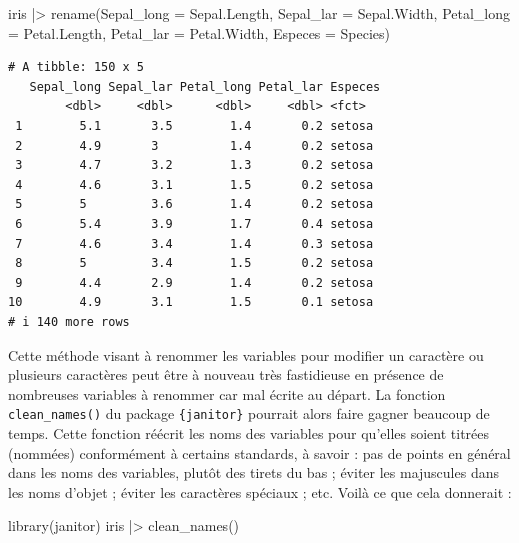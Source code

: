 \documentclass[
  letterpaper,
]{book}
\newenvironment{Shaded}{\begin{snugshade}}{\end{snugshade}}
\newcommand{\AttributeTok}[1]{\textcolor[rgb]{0.40,0.45,0.13}{#1}}
\newcommand{\FunctionTok}[1]{\textcolor[rgb]{0.28,0.35,0.67}{#1}}
\newcommand{\NormalTok}[1]{\textcolor[rgb]{0.00,0.23,0.31}{#1}}
\newcommand{\SpecialCharTok}[1]{\textcolor[rgb]{0.37,0.37,0.37}{#1}}
\begin{document}
\begin{Shaded}
\begin{Highlighting}[]
\NormalTok{iris }\SpecialCharTok{|\textgreater{}} 
  \FunctionTok{rename}\NormalTok{(}\AttributeTok{Sepal\_long =}\NormalTok{ Sepal.Length,}
         \AttributeTok{Sepal\_lar =}\NormalTok{ Sepal.Width,}
         \AttributeTok{Petal\_long =}\NormalTok{ Petal.Length,}
         \AttributeTok{Petal\_lar =}\NormalTok{ Petal.Width,}
         \AttributeTok{Especes =}\NormalTok{ Species)}
\end{Highlighting}
\end{Shaded}

\begin{verbatim}
# A tibble: 150 x 5
   Sepal_long Sepal_lar Petal_long Petal_lar Especes
        <dbl>     <dbl>      <dbl>     <dbl> <fct>  
 1        5.1       3.5        1.4       0.2 setosa 
 2        4.9       3          1.4       0.2 setosa 
 3        4.7       3.2        1.3       0.2 setosa 
 4        4.6       3.1        1.5       0.2 setosa 
 5        5         3.6        1.4       0.2 setosa 
 6        5.4       3.9        1.7       0.4 setosa 
 7        4.6       3.4        1.4       0.3 setosa 
 8        5         3.4        1.5       0.2 setosa 
 9        4.4       2.9        1.4       0.2 setosa 
10        4.9       3.1        1.5       0.1 setosa 
# i 140 more rows
\end{verbatim}

Cette méthode visant à renommer les variables pour modifier un caractère
ou plusieurs caractères peut être à nouveau très fastidieuse en présence
de nombreuses variables à renommer car mal écrite au départ. La fonction
\texttt{clean\_names()} du package \texttt{\{janitor\}} pourrait alors
faire gagner beaucoup de temps. Cette fonction réécrit les noms des
variables pour qu'elles soient titrées (nommées) conformément à certains
standards, à savoir : pas de points en général dans les noms des
variables, plutôt des tirets du bas ; éviter les majuscules dans les
noms d'objet ; éviter les caractères spéciaux ; etc. Voilà ce que cela
donnerait :

\begin{Shaded}
\begin{Highlighting}[]
\FunctionTok{library}\NormalTok{(janitor)}
\NormalTok{iris }\SpecialCharTok{|\textgreater{}}
  \FunctionTok{clean\_names}\NormalTok{()}
\end{Highlighting}
\end{Shaded}
\end{document}
